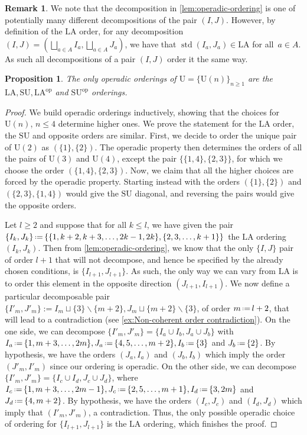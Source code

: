 \documentclass{amsart}
\newtheorem{proposition}[theorem]{Proposition}
\theoremstyle{definition}
\newtheorem{remark}[theorem]{Remark}
\newcommand{\Un}{\mathrm{U}} %
\newcommand{\ssm}{\smallsetminus} %
\newcommand{\eqdef}{\mbox{\,\raisebox{0.2ex}{\scriptsize\ensuremath{\mathrm:}}\ensuremath{=}\,}} %
\DeclareMathOperator{\std}{std}
\newcommand{\SU}{\mathrm{SU}}
\newcommand{\LA}{\mathrm{LA}}
\newcommand{\op}{\mathrm{op}}
\begin{document}
\begin{remark}
We note that the decomposition in \cref{lem:operadic-ordering} is one of potentially many different decompositions of the pair $(I,J)$. 
However, by definition of the $\LA$ order, for any decomposition $(I,J) = (\bigsqcup_{a\in A} I_a, \bigsqcup_{a \in A} J_a)$, we have that $\std(I_a, J_a) \in \LA$ for all~$a \in A$.
As such all decompositions of a pair $(I,J)$ order it the same way.
\end{remark}

\begin{proposition}
\label{prop:operadic-ordering}
The only operadic orderings of $\Un=\{\Un(n)\}_{n\geq 1}$ are the $\LA,\SU,\LA^{\op}$ and $\SU^{\op}$ orderings.
\end{proposition}

\begin{proof}
We build operadic orderings inductively, showing that the choices for $\Un(n)$, $n\leq 4$ determine higher ones. 
We prove the statement for the $\LA$ order, the $\SU$ and opposite orders are similar. 
First, we decide to order the unique pair of $\Un(2)$ as $(\{1\},\{2\})$.
The operadic property then determines the orders of all the pairs of $\Un(3)$ and $\Un(4)$, except the pair $\{\{1,4\},\{2,3\}\}$, for which we choose the order $(\{1,4\},\{2,3\})$.
Now, we claim that all the higher choices are forced by the operadic property. 
Starting instead with the orders $(\{1\},\{2\})$ and $(\{2,3\},\{1,4\})$ would give the $\SU$ diagonal, and reversing the pairs would give the opposite orders. 

Let $l\geq 2$ and suppose that for all $k\leq l$, we have given the pair $\{I_k,J_k\} \eqdef \{\{1,k+2,k+3,\dots,2k-1,2k\},\{2,3,\dots,k+1\}\}$ the $\LA$ ordering $(I_k,J_k)$.
Then from \cref{lem:operadic-ordering}, we know that the only $\{I,J\}$ pair of order $l+1$ that will not decompose, and hence be specified by the already chosen conditions, is $\{I_{l+1},J_{l+1}\}$.
As such, the only way we can vary from $\LA$ is to order this element in the opposite direction $(J_{l+1},I_{l+1})$. 
We now define a particular decomposable pair $\{I'_m,J'_m\}:= I_m \sqcup \{3\} \ssm \{m+2\}, J_m \sqcup \{m+2\} \ssm \{3\}$, of order $m \eqdef l+2$, that will lead to a contradiction (see \cref{ex:Non-coherent order contradiction}).
On the one side, we can decompose $\{I'_m,J'_m\} = \{I_a \cup I_b, J_a \cup J_b\}$ with $I_a \eqdef  \{1,m+3,\dots,2m\}, J_a \eqdef  \{4,5,\dots,m+2\}, I_b \eqdef \{3\}$ and $J_b \eqdef  \{2\}$. 
By hypothesis, we have the orders $(J_a,I_a)$ and $(J_b,I_b)$ which imply the order $(J'_m,I'_m)$ since our ordering is operadic. 
On the other side, we can decompose $\{I'_m,J'_m\} = \{I_c \cup I_d, J_c \cup J_d\}$, where $I_c \eqdef  \{1,m+3,\dots,  2m-1\}, J_c \eqdef \{2,5,\dots,m+1\}, I_d \eqdef \{3, 2m\}$ and $J_d \eqdef  \{4, m+2\}$.
By hypothesis, we have the orders $(I_c,J_c)$ and $(I_d,J_d)$ which imply that $(I'_m,J'_m)$, a contradiction.
Thus, the only possible operadic choice of ordering for $\{I_{l+1},J_{l+1}\}$ is the $\LA$ ordering, which finishes the proof. 
\end{proof}
\end{document}
